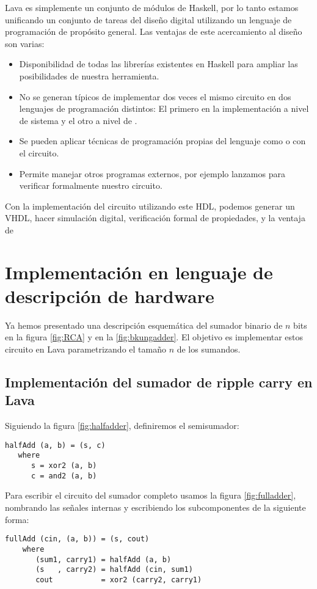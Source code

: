 Lava es simplemente un conjunto de módulos de Haskell, por lo tanto estamos unificando un conjunto de tareas del diseño digital utilizando un lenguaje de programación de propósito general. Las ventajas de este acercamiento al diseño son varias: 

\begin{itemize}
\item Disponibilidad de todas las librerías existentes en Haskell para ampliar las posibilidades de nuestra herramienta.
\item No se generan  típicos de implementar dos veces el mismo circuito en dos lenguajes de programación distintos: El primero en la implementación a nivel de sistema y el otro a nivel de .
\item Se pueden aplicar técnicas de programación propias del lenguaje como  o  con el circuito.
\item Permite manejar otros programas externos, por ejemplo lanzamos \cite{minisat} para verificar formalmente nuestro circuito.  
\end{itemize}


Con la implementación del circuito utilizando este HDL, podemos generar un  VHDL, hacer simulación digital, verificación formal de propiedades, y la ventaja de  


\section{Implementación en lenguaje de descripción de hardware}
Ya hemos presentado una descripción esquemática del sumador binario de \(n\) bits en la figura \ref{fig:RCA} y en la \ref{fig:bkungadder}. El objetivo es implementar estos circuito en Lava parametrizando el tamaño \(n\) de los sumandos. 

\subsection{Implementación del sumador de \textbf {ripple carry} en Lava}

\noindent Siguiendo la figura \ref{fig:halfadder}, definiremos el semisumador:
\begin{lstlisting}
halfAdd (a, b) = (s, c)
   where
      s = xor2 (a, b)
      c = and2 (a, b)
\end{lstlisting}
\noindent Para escribir el circuito del sumador completo usamos la figura \ref{fig:fulladder}, nombrando las señales internas y 
escribiendo los subcomponentes de la siguiente forma:
\begin{lstlisting}
fullAdd (cin, (a, b)) = (s, cout)
    where
       (sum1, carry1) = halfAdd (a, b)
       (s   , carry2) = halfAdd (cin, sum1)
       cout           = xor2 (carry2, carry1)
\end{lstlisting}

